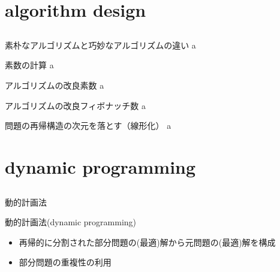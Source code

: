 \documentclass{beamer}
\subtitle{}
\begin{document}
\begin{frame}[fragile]{}
\titlepage
\end{frame}

\section{algorithm design}		%
\subsection{}

\begin{frame}[fragile]{素朴なアルゴリズムと巧妙なアルゴリズムの違い}{}
a
\end{frame}

\begin{frame}[fragile]{素数の計算}{}
a
\end{frame}

\begin{frame}[fragile]{アルゴリズムの改良}{素数}
a
\end{frame}

\begin{frame}[fragile]{アルゴリズムの改良}{フィボナッチ数}
a
\end{frame}

\begin{frame}[fragile]{問題の再帰構造の次元を落とす（線形化）}{}
a
\end{frame}

\section{dynamic programming}		%
\subsection{}

\begin{frame}[fragile]{動的計画法}{}

\begin{block}{動的計画法(dynamic programming)}
\begin{itemize}%
\item 再帰的に分割された部分問題の(最適)解から元問題の(最適)解を構成
\item 部分問題の重複性の利用
\end{itemize}
\end{block}


\end{frame}
\end{document}
